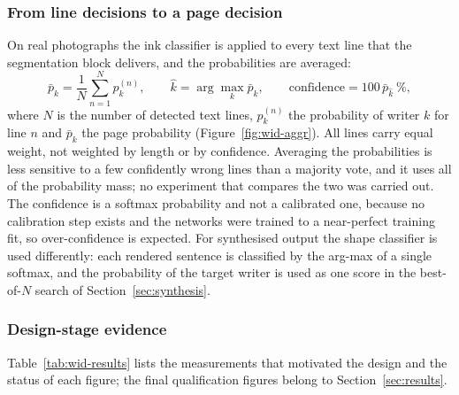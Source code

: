 \subsubsection{From line decisions to a page decision}

On real photographs the ink classifier is applied to every text line that the segmentation block delivers, and the probabilities are averaged:
\begin{equation}
\bar p_k=\frac1N\sum_{n=1}^Np^{(n)}_k,\qquad\hat k=\arg\max_k\bar p_k,\qquad\text{confidence}=100\,\bar p_{\hat k}\ \%,
\label{eq:wid-aggr}
\end{equation}
where $N$ is the number of detected text lines, $p^{(n)}_k$ the probability of writer $k$ for line $n$ and $\bar p_k$ the page probability (Figure~\ref{fig:wid-aggr}).
All lines carry equal weight, not weighted by length or by confidence.
Averaging the probabilities is less sensitive to a few confidently wrong lines than a majority vote, and it uses all of the probability mass; no experiment that compares the two was carried out.
The confidence is a softmax probability and not a calibrated one, because no calibration step exists and the networks were trained to a near-perfect training fit, so over-confidence is expected.
For synthesised output the shape classifier is used differently: each rendered sentence is classified by the arg-max of a single softmax, and the probability of the target writer is used as one score in the best-of-$N$ search of Section~\ref{sec:synthesis}.


\subsubsection{Design-stage evidence}

Table~\ref{tab:wid-results} lists the measurements that motivated the design and the status of each figure; the final qualification figures belong to Section~\ref{sec:results}.

